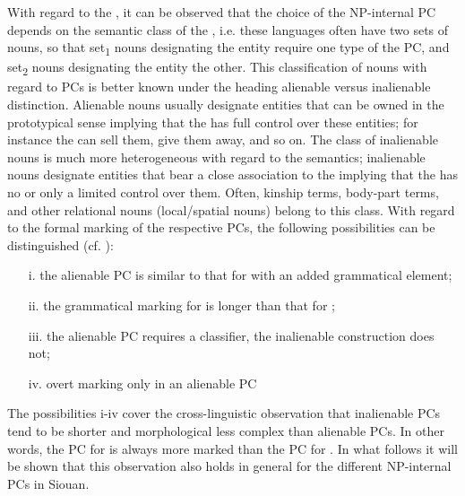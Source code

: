 \documentclass[output=paper]{LSP/langsci}
\begin{document}
With regard to the , it can be observed that the choice of the NP-internal PC depends on the semantic class of the , i.e. these languages often have two sets of nouns, so that set\textsubscript{1} nouns designating the  entity require one type of the PC, and set\textsubscript{2} nouns designating the  entity the other. This classification of nouns with regard to PCs is better known under the heading alienable versus inalienable distinction. Alienable nouns usually designate entities that can be owned in the prototypical sense implying that the  has full control over these  entities; for instance the  can sell them, give them away, and so on. The class of inalienable nouns is much more heterogeneous with regard to the semantics; inalienable nouns designate entities that bear a close association to the  implying that the  has no or only a limited control over them. Often, kinship terms, body-part terms, and other relational nouns (local/spatial nouns) belong to this class. 
With regard to the formal marking of the respective PCs, the following possibilities can be distinguished (cf. \citealt[286--290]{Dixon2010}):

\begin{enumerate}


\item[i.]	the alienable PC is similar to that for  with an added grammatical element;

\item[ii.]	the grammatical marking for  is longer than that for ;

\item[iii.]	the alienable PC requires a classifier, the inalienable construction does not;

\item[iv.]	overt marking only in an alienable PC
\end{enumerate}


The possibilities i-iv cover the cross-linguistic observation that inalienable PCs tend to be shorter and morphological less complex than alienable PCs. In other words, the PC for  is always more marked than the PC for . In what follows it will be shown that this observation also holds in general for the different NP-internal PCs in Siouan.
\end{document}

